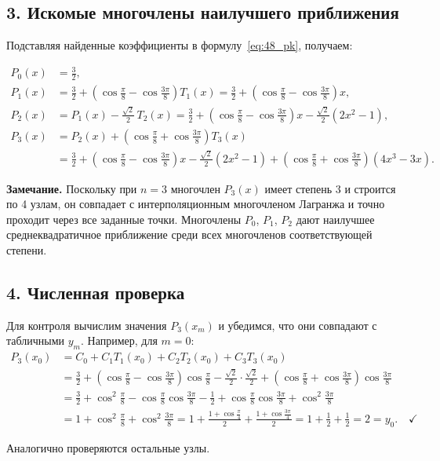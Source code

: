 \documentclass{article}
\begin{document}
\subsection*{3. Искомые многочлены наилучшего приближения}

Подставляя найденные коэффициенты в формулу~\eqref{eq:48_pk}, получаем:

\begin{align}
P_0(x) &= \frac{3}{2}, \\
P_1(x) &= \frac{3}{2} + \left(\cos\frac{\pi}{8} - \cos\frac{3\pi}{8}\right) T_1(x) = \frac{3}{2} + \left(\cos\frac{\pi}{8} - \cos\frac{3\pi}{8}\right) x, \\
P_2(x) &= P_1(x) - \frac{\sqrt{2}}{2}\, T_2(x) = \frac{3}{2} + \left(\cos\frac{\pi}{8} - \cos\frac{3\pi}{8}\right) x - \frac{\sqrt{2}}{2}(2x^2 - 1), \\
P_3(x) &= P_2(x) + \left(\cos\frac{\pi}{8} + \cos\frac{3\pi}{8}\right) T_3(x) \nonumber \\
&= \frac{3}{2} + \left(\cos\frac{\pi}{8} - \cos\frac{3\pi}{8}\right) x - \frac{\sqrt{2}}{2}(2x^2 - 1) + \left(\cos\frac{\pi}{8} + \cos\frac{3\pi}{8}\right)(4x^3 - 3x).
\end{align}

\textbf{Замечание.} Поскольку при $n = 3$ многочлен $P_3(x)$ имеет степень 3 и строится по 4 узлам, он совпадает с интерполяционным многочленом Лагранжа и точно проходит через все заданные точки. Многочлены $P_0$, $P_1$, $P_2$ дают наилучшее среднеквадратичное приближение среди всех многочленов соответствующей степени.

\subsection*{4. Численная проверка}

Для контроля вычислим значения $P_3(x_m)$ и убедимся, что они совпадают с табличными $y_m$. Например, для $m = 0$:
\begin{align}
P_3(x_0) &= C_0 + C_1 T_1(x_0) + C_2 T_2(x_0) + C_3 T_3(x_0) \nonumber \\
&= \frac{3}{2} + \left(\cos\frac{\pi}{8} - \cos\frac{3\pi}{8}\right)\cos\frac{\pi}{8} - \frac{\sqrt{2}}{2}\cdot\frac{\sqrt{2}}{2} + \left(\cos\frac{\pi}{8} + \cos\frac{3\pi}{8}\right)\cos\frac{3\pi}{8} \nonumber \\
&= \frac{3}{2} + \cos^2\frac{\pi}{8} - \cos\frac{\pi}{8}\cos\frac{3\pi}{8} - \frac{1}{2} + \cos\frac{\pi}{8}\cos\frac{3\pi}{8} + \cos^2\frac{3\pi}{8} \nonumber \\
&= 1 + \cos^2\frac{\pi}{8} + \cos^2\frac{3\pi}{8} = 1 + \frac{1+\cos\frac{\pi}{4}}{2} + \frac{1+\cos\frac{3\pi}{4}}{2} = 1 + \frac{1}{2} + \frac{1}{2} = 2 = y_0. \quad \checkmark
\end{align}

Аналогично проверяются остальные узлы.
\end{document}
